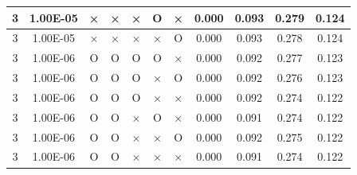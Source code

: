\documentclass[11pt]{article}
\begin{document}
\begin{longtable}[h]{|r|r|l|l|l|l|l|r|r|l|r|}
\multicolumn{1}{|c|}{3} & \multicolumn{1}{c|}{1.00E-05} & \multicolumn{1}{c|}{×} & \multicolumn{1}{c|}{×} & \multicolumn{1}{c|}{×} & \multicolumn{1}{c|}{O} & \multicolumn{1}{c|}{×} & \multicolumn{1}{c|}{0.000} & \multicolumn{1}{c|}{0.093} & \multicolumn{1}{c|}{0.279} & \multicolumn{1}{c|}{0.124} \\ \hline
\multicolumn{1}{|c|}{3} & \multicolumn{1}{c|}{1.00E-05} & \multicolumn{1}{c|}{×} & \multicolumn{1}{c|}{×} & \multicolumn{1}{c|}{×} & \multicolumn{1}{c|}{×} & \multicolumn{1}{c|}{O} & \multicolumn{1}{c|}{0.000} & \multicolumn{1}{c|}{0.093} & \multicolumn{1}{c|}{0.278} & \multicolumn{1}{c|}{0.124} \\ \hline
\multicolumn{1}{|c|}{3} & \multicolumn{1}{c|}{1.00E-06} & \multicolumn{1}{c|}{O} & \multicolumn{1}{c|}{O} & \multicolumn{1}{c|}{O} & \multicolumn{1}{c|}{O} & \multicolumn{1}{c|}{×} & \multicolumn{1}{c|}{0.000} & \multicolumn{1}{c|}{0.092} & \multicolumn{1}{c|}{0.277} & \multicolumn{1}{c|}{0.123} \\ \hline
\multicolumn{1}{|c|}{3} & \multicolumn{1}{c|}{1.00E-06} & \multicolumn{1}{c|}{O} & \multicolumn{1}{c|}{O} & \multicolumn{1}{c|}{O} & \multicolumn{1}{c|}{×} & \multicolumn{1}{c|}{O} & \multicolumn{1}{c|}{0.000} & \multicolumn{1}{c|}{0.092} & \multicolumn{1}{c|}{0.276} & \multicolumn{1}{c|}{0.123} \\ \hline
\multicolumn{1}{|c|}{3} & \multicolumn{1}{c|}{1.00E-06} & \multicolumn{1}{c|}{O} & \multicolumn{1}{c|}{O} & \multicolumn{1}{c|}{O} & \multicolumn{1}{c|}{×} & \multicolumn{1}{c|}{×} & \multicolumn{1}{c|}{0.000} & \multicolumn{1}{c|}{0.092} & \multicolumn{1}{c|}{0.274} & \multicolumn{1}{c|}{0.122} \\ \hline
\multicolumn{1}{|c|}{3} & \multicolumn{1}{c|}{1.00E-06} & \multicolumn{1}{c|}{O} & \multicolumn{1}{c|}{O} & \multicolumn{1}{c|}{×} & \multicolumn{1}{c|}{O} & \multicolumn{1}{c|}{×} & \multicolumn{1}{c|}{0.000} & \multicolumn{1}{c|}{0.091} & \multicolumn{1}{c|}{0.274} & \multicolumn{1}{c|}{0.122} \\ \hline
\multicolumn{1}{|c|}{3} & \multicolumn{1}{c|}{1.00E-06} & \multicolumn{1}{c|}{O} & \multicolumn{1}{c|}{O} & \multicolumn{1}{c|}{×} & \multicolumn{1}{c|}{×} & \multicolumn{1}{c|}{O} & \multicolumn{1}{c|}{0.000} & \multicolumn{1}{c|}{0.092} & \multicolumn{1}{c|}{0.275} & \multicolumn{1}{c|}{0.122} \\ \hline
\multicolumn{1}{|c|}{3} & \multicolumn{1}{c|}{1.00E-06} & \multicolumn{1}{c|}{O} & \multicolumn{1}{c|}{O} & \multicolumn{1}{c|}{×} & \multicolumn{1}{c|}{×} & \multicolumn{1}{c|}{×} & \multicolumn{1}{c|}{0.000} & \multicolumn{1}{c|}{0.091} & \multicolumn{1}{c|}{0.274} & \multicolumn{1}{c|}{0.122} \\ \hline

\end{longtable}
\end{document}
